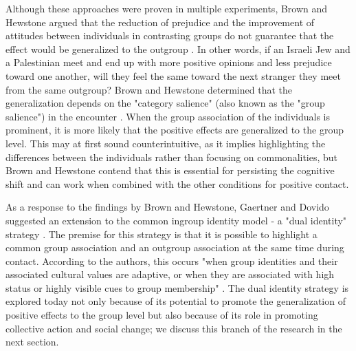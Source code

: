 \documentclass[dissertation,math,vertlayout,pdfa,colorlinks,nologo]{aaltoseries}
\begin{document}
Although these approaches were proven in multiple experiments, Brown and Hewstone argued that the reduction of prejudice and the improvement of attitudes between individuals in contrasting groups do not guarantee that the effect would be generalized to the outgroup \cite{brownIntegrativeTheoryIntergroup2005}. In other words, if an Israeli Jew and a Palestinian meet and end up with more positive opinions and less prejudice toward one another, will they feel the same toward the next stranger they meet from the same outgroup? Brown and Hewstone determined that the generalization depends on the "category salience" (also known as the "group salience") in the encounter \cite{brownChangingAttitudesIntergroup1999,brownIntegrativeTheoryIntergroup2005}. When the group association of the individuals is prominent, it is more likely that the positive effects are generalized to the group level. This may at first sound counterintuitive, as it implies highlighting the differences between the individuals rather than focusing on commonalities, but Brown and Hewstone contend that this is essential for persisting the cognitive shift and can work when combined with the other conditions for positive contact.

As a response to the findings by Brown and Hewstone, Gaertner and Dovido suggested an extension to the common ingroup identity model - a "dual identity" strategy \cite{gaertnerCategorizationRecategorizationIntergroup2005, brownIntegrativeTheoryIntergroup2005}. The premise for this strategy is that it is possible to highlight a common group association and an outgroup association at the same time during contact. According to the authors, this occurs "when group identities and their associated cultural values are adaptive, or when they are associated with high status or highly visible cues to group membership" \cite[p. 80]{gaertnerCategorizationRecategorizationIntergroup2005}. The dual identity strategy is explored today not only because of its potential to promote the generalization of positive effects to the group level but also because of its role in promoting collective action and social change; we discuss this branch of the research in the next section.
\end{document}
